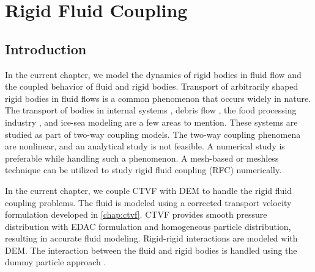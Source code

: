 \chapter{Rigid Fluid Coupling}
\label{chap:rfc}

\section{Introduction}
\label{sec:rfc:intro}
In the current chapter, we model the dynamics of rigid bodies in fluid flow and
the coupled behavior of fluid and rigid bodies. Transport of arbitrarily shaped
rigid bodies in fluid flows is a common phenomenon that occurs widely in nature.
The transport of bodies in internal systems \parencite{Dai2021}, debris flow
\parencite{Qingyun2022}, the food processing industry \parencite{Karunasena2014}, and
ice-sea modeling \parencite{Mintu2018} are a few areas to mention. These systems are
studied as part of two-way coupling models. The two-way coupling phenomena are
nonlinear, and an analytical study is not feasible. A numerical study is
preferable while handling such a phenomenon. A mesh-based or meshless technique
can be utilized to study rigid fluid coupling (RFC) numerically.


In the current chapter, we couple CTVF with DEM to handle the rigid fluid
coupling problems. The fluid is modeled using a corrected transport
velocity formulation developed in \cref{chap:ctvf}. CTVF provides smooth
pressure distribution with EDAC formulation and homogeneous particle
distribution, resulting in accurate fluid modeling. Rigid-rigid interactions are
modeled with DEM. The interaction between the fluid and rigid bodies is
handled using the dummy particle approach \parencite{Adami2012}.


\FloatBarrier%
